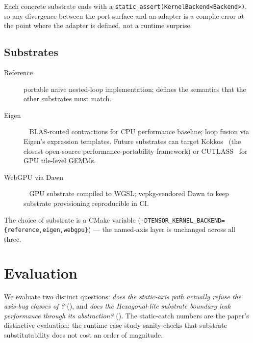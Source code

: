\documentclass[10pt,twocolumn]{article}
\newcommand{\code}[1]{\texttt{#1}}
\begin{document}
Each concrete substrate ends with a
\code{static\_assert(KernelBackend<Backend>)}, so any divergence
between the port surface and an adapter is a compile error at the
point where the adapter is defined, not a runtime surprise.

\subsection{Substrates}

\begin{description}
  \item[Reference] portable naive nested-loop implementation; defines
        the semantics that the other substrates must match.
  \item[Eigen]~\cite{guennebaud2010eigen} BLAS-routed contractions
        for CPU performance baseline; loop fusion via Eigen's
        expression templates. Future substrates can target
        Kokkos~\cite{trott2022kokkos} (the closest open-source
        performance-portability framework) or
        CUTLASS~\cite{nvidia2017cutlass} for GPU tile-level GEMMs.
  \item[WebGPU via Dawn]~\cite{dawn,kenwright2024webgpu} GPU substrate compiled to
        WGSL; vcpkg-vendored Dawn to keep substrate provisioning
        reproducible in CI.
\end{description}

The choice of substrate is a CMake variable
(\code{-DTENSOR\_KERNEL\_BACKEND=\{reference,eigen,webgpu\}}) ---
the named-axis layer is unchanged across all three.

\section{Evaluation}
\label{sec:eval}

We evaluate two distinct questions: \emph{does the static-axis path
actually refuse the axis-bug classes of ?}
(), and \emph{does the Hexagonal-lite
substrate boundary leak performance through its abstraction?}
(). The static-catch numbers are the paper's
distinctive evaluation; the runtime case study sanity-checks that
substrate substitutability does not cost an order of magnitude.
\end{document}
